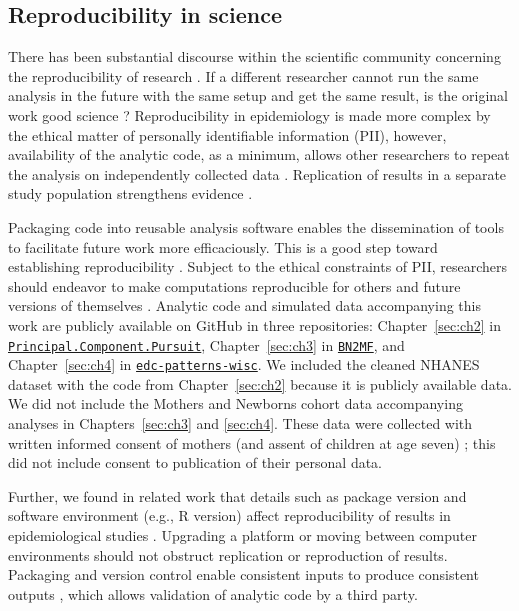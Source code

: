 
\subsection{Reproducibility in science}
There has been substantial discourse within the scientific community concerning the reproducibility of research \citep{baker20161}. If a different researcher cannot run the same analysis in the future with the same setup and get the same result, is the original work good science \citep{goodman2016does}? Reproducibility in epidemiology is made more complex by the ethical matter of personally identifiable information (PII), however, availability of the analytic code, as a minimum, allows other researchers to repeat the analysis on independently collected data \citep{peng2011reproducible}. Replication of results in a separate study population strengthens evidence \citep{peng2006reproducible}.

Packaging code into reusable analysis software enables the dissemination of tools to facilitate future work more efficaciously. This is a good step toward establishing reproducibility \citep{collberg2015repeatability}. Subject to the ethical constraints of PII, researchers should endeavor to make computations reproducible for others and future versions of themselves \citep{barnes2010publish}. Analytic code and simulated data accompanying this work are publicly available on GitHub in three repositories: Chapter~\ref{sec:ch2} in \texttt{\href{https://github.com/lizzyagibson/Principal.Component.Pursuit}{Principal.Component.Pursuit}}, Chapter~\ref{sec:ch3} in \texttt{\href{https://github.com/lizzyagibson/BN2MF}{BN2MF}}, and Chapter~\ref{sec:ch4} in \texttt{\href{https://github.com/lizzyagibson/edc-patterns-wisc}{edc-patterns-wisc}}. We included the cleaned NHANES dataset with the code from Chapter~\ref{sec:ch2} because it is publicly available data. We did not include the Mothers and Newborns cohort data accompanying analyses in Chapters~\ref{sec:ch3} and \ref{sec:ch4}. These data were collected with written informed consent of mothers (and assent of children at age seven) \citep{perera03}; this did not include consent to publication of their personal data.

Further, we found in related work that details such as package version and software environment (e.g., R version) affect reproducibility of results in epidemiological studies \citep{nunez2020reflection}. Upgrading a platform or moving between computer environments should not obstruct replication or reproduction of results. Packaging and version control enable consistent inputs to produce consistent outputs \citep{wilson2014best}, which allows validation of analytic code by a third party.


